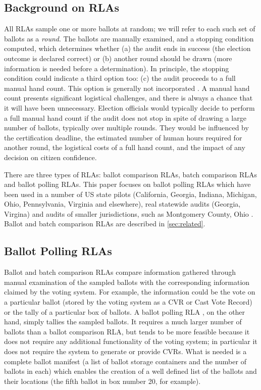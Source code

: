 \subsection{Background on RLAs}
All RLAs sample one or more ballots at random; we will refer to each such set of ballots as a {\em round}. The ballots are manually examined, and a stopping condition computed, which determines whether (a) the audit ends in success (the election outcome is declared correct) or (b) another round should be drawn (more information is needed before a determination). In principle, the stopping condition could indicate a third option too: (c) the audit proceeds to a full manual hand count. This option is generally not incorporated \cite{bravo}. A manual hand count presents significant logistical challenges, and there is always a chance that it will have been unnecessary. Election officials would typically decide to perform a full manual hand count if the audit does not stop in spite of drawing a large number of ballots, typically over multiple rounds. They would be influenced by the certification deadline, the estimated number of human hours required for another round, the logistical costs of a full hand count, and the impact of any decision on citizen confidence. 

There are three types of RLAs: ballot comparison RLAs, batch comparison RLAs and ballot polling RLAs. This paper focuses on ballot polling RLAs which have been used in a number of US state pilots (California, Georgia, Indiana, Michigan, Ohio, Pennsylvania, Virginia and elsewhere), real statewide audits (Georgia, Virgina) \cite{vv_audits} and  audits of smaller jurisdictions, such as Montgomery County, Ohio \cite{usenix_minerva}. Ballot and batch comparison RLAs are described in \ref{sec:related}. 

\subsection{Ballot Polling RLAs}
\label{sec:polling}
Ballot and batch comparison RLAs compare information gathered through manual examination of the sampled ballots with the corresponding information claimed by the voting system. For example, the information could be the vote on a particular ballot (stored by the voting system as a CVR or Cast Vote Record) or the tally of a particular box of ballots. A ballot polling RLA \cite{RLA}, on the other hand, simply tallies the sampled ballots. It requires a much larger number of ballots than a ballot comparison RLA, but tends to be more feasible because it does not require any additional functionality of the voting system; in particular it does not require the system to generate or provide CVRs. What is needed is a complete ballot manifest (a list of ballot storage containers and the number of ballots in each) which enables the creation of a well defined list of the ballots and their locations (the fifth ballot in box number 20, for example).  

